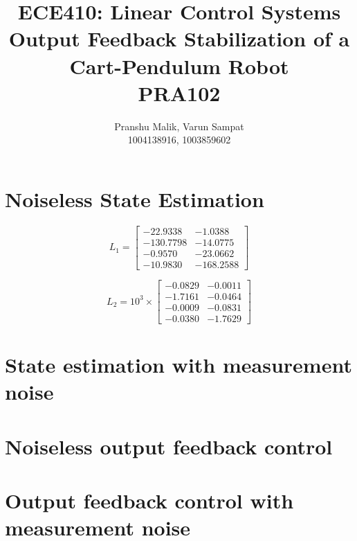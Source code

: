 \documentclass[10pt]{article}
\date{}
\begin{document}
\title{\textbf{\Large{\textsc{ECE410:} Linear Control Systems}} \\ \Large{Output Feedback Stabilization of a Cart-Pendulum Robot} \\ \textbf{\small{PRA102}}\vspace{-0.3cm}}
\author{Pranshu Malik, Varun Sampat \\ \footnotesize{1004138916}, \footnotesize{1003859602}\vspace{-3cm}}

\maketitle

\section{Noiseless State Estimation}

\begin{equation*}
    L_1 = \begin{bmatrix}
    -22.9338 & -1.0388 \\
    -130.7798 & -14.0775 \\ 
    -0.9570 & -23.0662 \\ 
    -10.9830 & -168.2588
    \end{bmatrix}
\end{equation*}

\begin{equation*}
    L_2 = 10^{3} \times \begin{bmatrix}
    -0.0829  & -0.0011 \\
    -1.7161  & -0.0464 \\ 
    -0.0009  & -0.0831 \\ 
    -0.0380  & -1.7629
    \end{bmatrix}
\end{equation*}

\section{State estimation with measurement noise}
\section{Noiseless output feedback control}
\section{Output feedback control with measurement noise}
\end{document}
